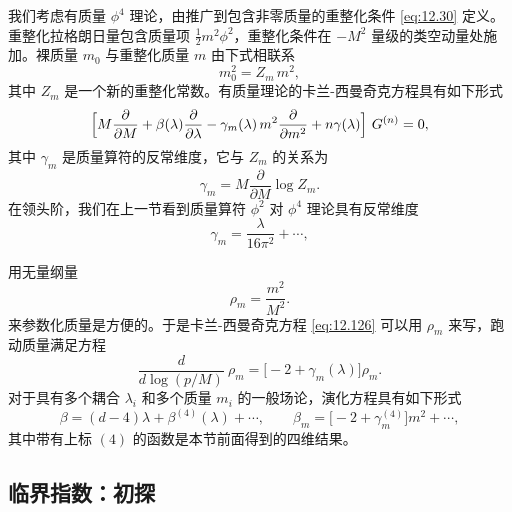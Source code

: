 我们考虑有质量 $\phi^4$ 理论，由推广到包含非零质量的重整化条件 \eqref{eq:12.30} 定义。重整化拉格朗日量包含质量项 $\tfrac{1}{2}m^2\phi^2$，重整化条件在 $-M^2$ 量级的类空动量处施加。裸质量 $m_0$ 与重整化质量 $m$ 由下式相联系
\begin{equation}
  m_0^2 = Z_m\,m^2 ,
\end{equation}
其中 $Z_m$ 是一个新的重整化常数。有质量理论的卡兰-西曼奇克方程具有如下形式
\begin{equation}
  \Bigl[ M\frac{\partial}{\partial M} + \beta(\lambda)\frac{\partial}
    {\partial\lambda} - \gamma_m(\lambda)\,m^2\frac{\partial}{\partial m^2}
    + n\gamma(\lambda) \Bigr]\ G^{(n)} = 0 ,
  \label{eq:12.126}
\end{equation}
其中 $\gamma_m$ 是质量算符的反常维度，它与 $Z_m$ 的关系为
\begin{equation}
  \gamma_m = M\frac{\partial}{\partial M}\log Z_m .
\end{equation}
在领头阶，我们在上一节看到质量算符 $\phi^2$ 对 $\phi^4$ 理论具有反常维度
\begin{equation}
  \gamma_m = \frac{\lambda}{16\pi^2} + \cdots ,
  \label{eq:12.127}
\end{equation}

用无量纲量
\begin{equation}
  \rho_m = \frac{m^2}{M^2} .
\end{equation}
来参数化质量是方便的。于是卡兰-西曼奇克方程 \eqref{eq:12.126} 可以用 $\rho_m$ 来写，跑动质量满足方程
\begin{equation}
  \frac{d}{d\log(p/M)}\ \rho_m = \bigl[ -2 + \gamma_m(\lambda) \bigr]\rho_m .
  \label{eq:12.131}
\end{equation}
对于具有多个耦合 $\lambda_i$ 和多个质量 $m_i$ 的一般场论，演化方程具有如下形式
\begin{equation}
  \beta = (d-4)\lambda + \beta^{(4)}(\lambda) + \cdots,\qquad
  \beta_m = \bigl[ -2 + \gamma_m^{(4)} \bigr]m^2 + \cdots ,
  \label{eq:12.132}
\end{equation}
其中带有上标 $(4)$ 的函数是本节前面得到的四维结果。

\subsection{临界指数：初探}

